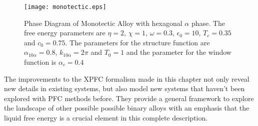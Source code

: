 \begin{figure}
    \centering
	\texttt{[image: monotectic.eps]}
    \caption[Monotectic Phase Diagram]{
        \label{monotectic} Phase Diagram of Monotectic Alloy with hexagonal
        $\alpha$ phase. The free energy parameters are $\eta = 2$, $\chi=1$,
        $\omega=0.3$, $\epsilon_0 = 10$, $T_c = 0.35$ and $c_0 = 0.75$. The
        parameters for the structure function are $\alpha_{10\alpha} = 0.8$,
        $k_{10\alpha} = 2\pi$ and $T_0 = 1$ and the parameter for the window
        function is $\alpha_c = 0.4$
    }
\end{figure}

The improvements to the XPFC formalism made in this chapter not only reveal new 
details in existing systems, but also model new systems that haven't been explored 
with PFC methods before. They provide a general framework to explore the 
landscape of other possible possible binary alloys with an emphasis that the liquid 
free energy is a crucial element in this complete description. 

